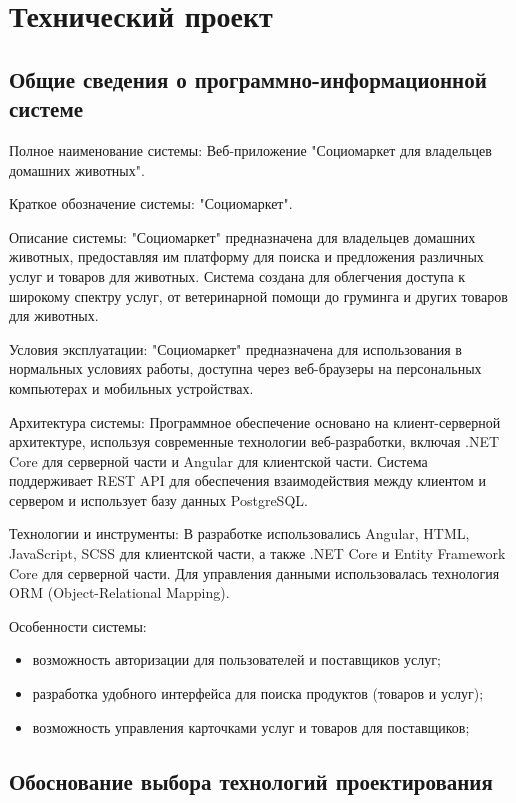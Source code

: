 \section{Технический проект}

\subsection{Общие сведения о программно-информационной системе}

Полное наименование системы: Веб-приложение "Социомаркет для владельцев домашних животных".

Краткое обозначение системы: "Социомаркет".

Описание системы: "Социомаркет" предназначена для владельцев домашних животных, предоставляя им платформу для поиска и предложения различных услуг и товаров для животных. Система создана для облегчения доступа к широкому спектру услуг, от ветеринарной помощи до груминга и других товаров для животных.

Условия эксплуатации: "Социомаркет" предназначена для использования в нормальных условиях работы, доступна через веб-браузеры на персональных компьютерах и мобильных устройствах.

Архитектура системы: Программное обеспечение основано на клиент-серверной архитектуре, используя современные технологии веб-разработки, включая .NET Core для серверной части и Angular для клиентской части. Система поддерживает REST API для обеспечения взаимодействия между клиентом и сервером и использует базу данных PostgreSQL.

Технологии и инструменты: В разработке использовались Angular, HTML, JavaScript, SCSS для клиентской части, а также .NET Core и Entity Framework Core для серверной части. Для управления данными использовалась технология ORM (Object-Relational Mapping).

Особенности системы:
\begin{itemize}
    \item возможность авторизации для пользователей и поставщиков услуг;
    \item разработка удобного интерфейса для поиска продуктов (товаров и услуг);
    \item возможность управления карточками услуг и товаров для поставщиков;
\end{itemize}

\subsection{Обоснование выбора технологий проектирования}
